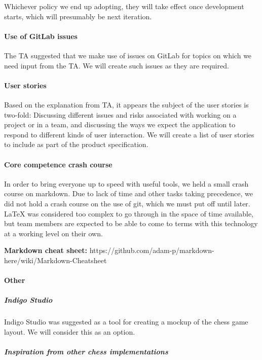 \documentclass{article}
\begin{document}
Whichever policy we end up adopting, they will take effect once development starts, which will presumably be next iteration.

\paragraph{Use of GitLab issues}

The TA suggested that we make use of issues on GitLab for topics on which we need input from the TA. We will create such issues as they are required.

\paragraph{User stories}

Based on the explanation from TA, it appears the subject of the user stories is two-fold: Discussing different issues and risks associated with working on a project or in a team, and discussing the ways we expect the application to respond to different kinds of user interaction. We will create a list of user stories to include as part of the product specification.

\paragraph{Core competence crash course}

In order to bring everyone up to speed with useful tools, we held a small crash course on markdown. Due to lack of time and other tasks taking precedence, we did not hold a crash course on the use of git, which we must put off until later. LaTeX was considered too complex to go through in the space of time available, but team members are expected to be able to come to terms with this technology at a working level on their own.

\textbf{Markdown cheat sheet:} https://github.com/adam-p/markdown-here/wiki/Markdown-Cheatsheet

\paragraph{Other}

\subparagraph{Indigo Studio}

Indigo Studio was suggested as a tool for creating a mockup of the chess game layout. We will consider this as an option.

\subparagraph{Inspiration from other chess implementations}
\end{document}
